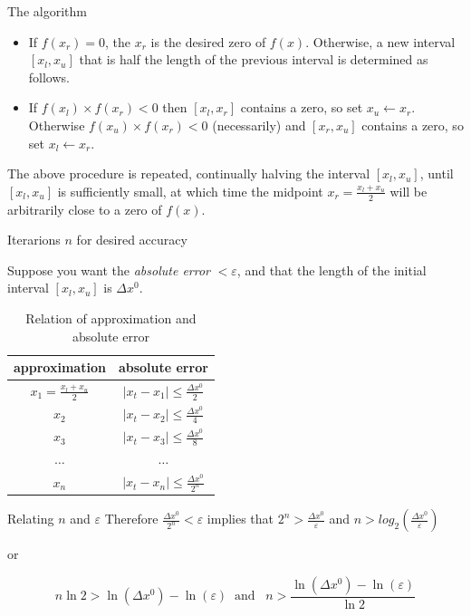 \documentclass[12pt]{beamer}
\begin{document}
\begin{frame}{The algorithm}
\begin{itemize}
\item If $f(x_r) = 0$, the $x_r$ is the desired zero of $f(x)$. Otherwise, a new interval $[x_l, x_u]$ that is half the length of the previous interval is determined as follows. 

\item If $f(x_l) \times f(x_r)<0$ then $[x_l, x_r]$ contains a zero, so set $x_u \leftarrow x_r$. Otherwise $f(x_u) \times f(x_r) < 0$ (necessarily) and $[x_r, x_u]$ contains a zero, so set $x_l \leftarrow x_r$. 
\end{itemize}

The above procedure is repeated, continually halving the interval $[x_l, x_u]$, until 
$[x_l, x_u]$ is sufficiently small, at which time the midpoint $x_r = \frac{x_l+x_u}{2}$ will be arbitrarily close to a zero of $f(x)$. 
\vspace{1 in}
\end{frame}

\begin{frame}{Iterarions $n$ for desired accuracy} 

Suppose you want the {\em absolute error} $< \varepsilon$, and that the length of the initial interval $[x_l, x_u]$ is $\Delta x^0$. 


\begin{table}[h]
\begin{center}
\begin{tabular}{c|c}
approximation & absolute error \\
\hline
$x_1 = \frac{x_l+x_u}{2}$ & $|x_t-x_1| \leq \frac{\Delta x^0}{2}$ \\ 
$x_2$                      & $|x_t-x_2| \leq \frac{\Delta x^0}{4}$ \\ 
$x_3$                      & $|x_t-x_3| \leq \frac{\Delta x^0}{8}$ \\ 
$\dots$                    & $\dots$ \\ 
$x_n$                      & $|x_t-x_n| \leq \frac{\Delta x^0}{2^n}$ \\ 

\end{tabular}
\caption{Relation of approximation and absolute error} 
\end{center}
\end{table}
\end{frame} 

\begin{frame}{Relating $n$ and $\varepsilon$} 
Therefore $\frac{\Delta x^0}{2^n} < \varepsilon$ implies that 
$2^n > \frac{\Delta x^0}{\varepsilon}$ and $n > log_2\left( \frac{\Delta x^0}{\varepsilon}{}\right)$

\vspace{\baselineskip}
 or 

\[
n \ln 2 > \ln{(\Delta x^0)} - \ln(\varepsilon) \;\; \mbox{and} \;\;\; n > \frac{\ln{(\Delta x^0)}-\ln{(\varepsilon)}}{\ln 2}
\] 
\end{frame} 
\end{document}
